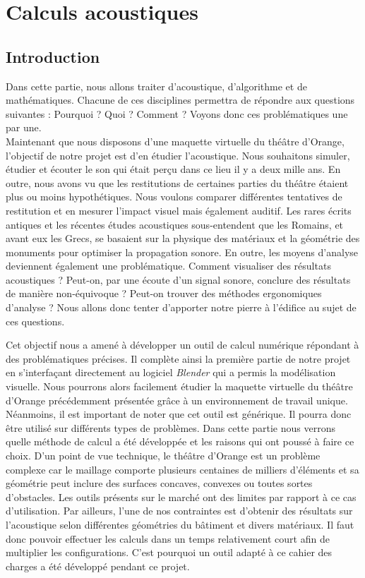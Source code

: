 \part{Calculs acoustiques}
	\chapter*{Introduction}
Dans cette partie, nous allons traiter d'acoustique, d'algorithme et de mathématiques. Chacune de ces disciplines permettra de répondre aux questions suivantes : Pourquoi ? Quoi ? Comment ? Voyons donc ces problématiques une par une.\\

Maintenant que nous disposons d'une maquette virtuelle du théâtre d'Or\-ange, l'objectif de notre projet est d'en étudier l'acoustique. Nous souhaitons simuler, étudier et écouter le son qui était perçu dans ce lieu il y a deux mille ans. En outre, nous avons vu que les restitutions de certaines parties du théâtre étaient plus ou moins hypothétiques. Nous voulons comparer différentes tentatives de restitution et en mesurer l'impact visuel mais également auditif. Les rares écrits antiques et les récentes études acoustiques sous-entendent que les Romains, et avant eux les Grecs, se basaient sur la physique des matériaux et la géométrie des monuments pour optimiser la propagation sonore. En outre, les moyens d'analyse  deviennent également une problématique. Comment visualiser des résultats acoustiques ? Peut-on, par une écoute d'un signal sonore, conclure des résultats de manière non-équivoque ? Peut-on trouver des méthodes ergonomiques d'analyse ? Nous allons donc tenter d'apporter notre pierre à l'édifice au sujet de ces questions. 

Cet objectif nous a amené à développer un outil de calcul numérique répondant à des problématiques précises. Il complète ainsi la première partie de notre projet en s'interfaçant directement au logiciel \textit{Blender} qui a permis la modélisation visuelle. Nous pourrons alors facilement étudier la maquette virtuelle du théâtre d'Orange précédemment présentée grâce à un environnement de travail unique. Néanmoins, il est important de noter que cet outil est générique. Il pourra donc être utilisé sur différents types de problèmes. Dans cette partie nous verrons quelle méthode de calcul a été développée et les raisons qui ont poussé à faire ce choix. D'un point de vue technique, le théâtre d'Orange est un problème complexe car le maillage comporte plusieurs centaines de milliers d'éléments et sa géométrie peut inclure des surfaces concaves, convexes ou toutes sortes d'obstacles. Les outils présents sur le marché ont des limites par rapport à ce cas d'utilisation. Par ailleurs, l'une de nos contraintes est d'obtenir des résultats sur l'acoustique selon différentes géométries du bâtiment et divers matériaux. Il faut donc pouvoir effectuer les calculs dans un temps relativement court afin de multiplier les configurations. C'est pourquoi un outil adapté à ce cahier des charges a été développé pendant ce projet.


